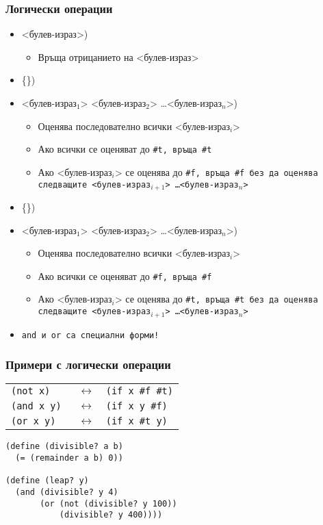 \documentclass{beamer}
\begin{document}
\begin{frame}
  \frametitle{Логически операции}

  \begin{itemize}[<+->]
  \item {} <булев-израз>\tta)
    \begin{itemize}
    \item Връща отрицанието на <булев-израз>
    \end{itemize}
  \item {} \{<булев-израз>\}\tta)
  \item {} <булев-израз$_1$> <булев-израз$_2$> \ldots <булев-израз$_n$>\tta)
    \begin{itemize}
    \item Оценява последователно всички <булев-израз$_i$>
    \item Ако всички се оценяват до \tt{\#t}, връща \tt{\#t}
    \item Ако <булев-израз$_i$> се оценява до \tt{\#f}, връща
      \tt{\#f} без да оценява следващите <булев-израз$_{i+1}$> \ldots <булев-израз$_n$>
    \end{itemize}
  \item {} \{<булев-израз>\}\tta)
  \item {} <булев-израз$_1$> <булев-израз$_2$> \ldots <булев-израз$_n$>\tta)
    \begin{itemize}
    \item Оценява последователно всички <булев-израз$_i$>
    \item Ако всички се оценяват до \tt{\#f}, връща \tt{\#f}
    \item Ако <булев-израз$_i$> се оценява до \tt{\#t}, връща
      \tt{\#t} без да оценява следващите <булев-израз$_{i+1}$> \ldots <булев-израз$_n$>
    \end{itemize}
  \item \alert{\tt{and} и \tt{or} са специални форми!}
  \end{itemize}
\end{frame}

\begin{frame}[fragile]
  \frametitle{Примери с логически операции}

  \begin{tabular}{lcl}
    \tt{(not x)} &$\longleftrightarrow$& \tt{(if x \#f \#t)}\\
    \tt{(and x y)} &$\longleftrightarrow$& \tt{(if x y \#f)}\\
    \tt{(or x y)} &$\longleftrightarrow$& \tt{(if x \#t y)}
  \end{tabular}


\begin{verbatim}
(define (divisible? a b)
  (= (remainder a b) 0))

(define (leap? y)
  (and (divisible? y 4)
       (or (not (divisible? y 100))
           (divisible? y 400))))
\end{verbatim}
\end{frame}
\end{document}
